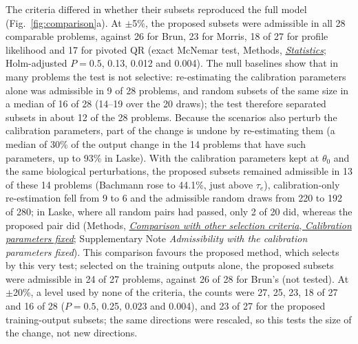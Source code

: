 \documentclass[pdflatex,sn-nature]{sn-jnl}
\theoremstyle{plain}
\newcommand{\mref}[2]{\hyperref[#1]{#2}}
\begin{document}
The criteria differed in whether their subsets reproduced the full model (Fig.~\ref{fig:comparison}a). At $\pm$5\%, the proposed subsets were admissible in all 28 comparable problems, against 26 for Brun, 23 for Morris, 18 of 27 for profile likelihood and 17 for pivoted QR (exact McNemar test, Methods, \mref{met:stats}{\emph{Statistics}}; Holm-adjusted $P=0.5$, 0.13, 0.012 and 0.004). The null baselines show that in many problems the test is not selective: re-estimating the calibration parameters alone was admissible in 9 of 28 problems, and random subsets of the same size in a median of 16 of 28 (14--19 over the 20 draws); the test therefore separated subsets in about 12 of the 28 problems. Because the scenarios also perturb the calibration parameters, part of the change is undone by re-estimating them (a median of 30\% of the output change in the 14 problems that have such parameters, up to 93\% in Laske). With the calibration parameters kept at $\theta_0$ and the same biological perturbations, the proposed subsets remained admissible in 13 of these 14 problems (Bachmann rose to 44.1\%, just above $\tau_e$), calibration-only re-estimation fell from 9 to 6 and the admissible random draws from 220 to 192 of 280; in Laske, where all random pairs had passed, only 2 of 20 did, whereas the proposed pair did (Methods, \mref{met:comp-cal}{\emph{Comparison with other selection criteria}, \emph{Calibration parameters fixed}}; Supplementary Note \textit{Admissibility with the calibration parameters fixed}). This comparison favours the proposed method, which selects by this very test; selected on the training outputs alone, the proposed subsets were admissible in 24 of 27 problems, against 26 of 28 for Brun's (not tested). At $\pm$20\%, a level used by none of the criteria, the counts were 27, 25, 23, 18 of 27 and 16 of 28 ($P=0.5$, 0.25, 0.023 and 0.004), and 23 of 27 for the proposed training-output subsets; the same directions were rescaled, so this tests the size of the change, not new directions.
\end{document}
